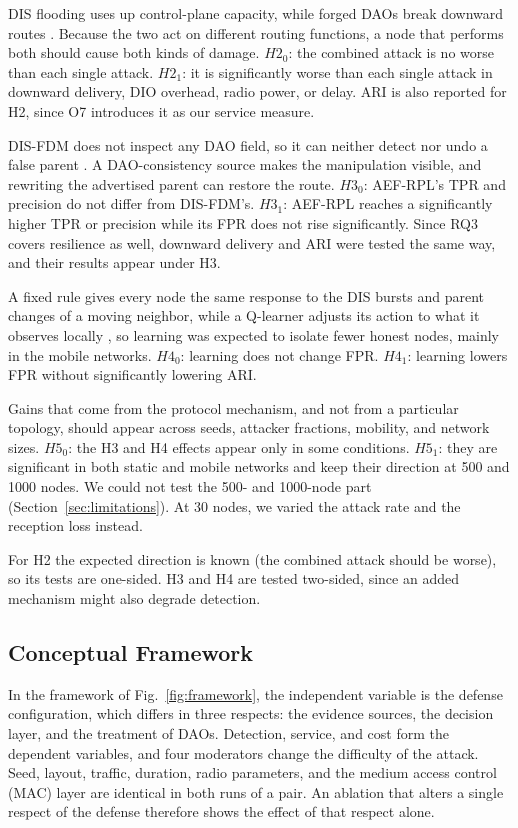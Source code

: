 DIS flooding uses up control-plane capacity, while forged DAOs break downward routes \cite{rajasekar2022,pu2018}. Because the two act on different routing functions, a node that performs both should cause both kinds of damage. $H2_0$: the combined attack is no worse than each single attack. $H2_1$: it is significantly worse than each single attack in downward delivery, DIO overhead, radio power, or delay. ARI is also reported for H2, since O7 introduces it as our service measure.

DIS-FDM does not inspect any DAO field, so it can neither detect nor undo a false parent \cite{prajisha2025}. A DAO-consistency source makes the manipulation visible, and rewriting the advertised parent can restore the route. $H3_0$: AEF-RPL's TPR and precision do not differ from DIS-FDM's. $H3_1$: AEF-RPL reaches a significantly higher TPR or precision while its FPR does not rise significantly. Since RQ3 covers resilience as well, downward delivery and ARI were tested the same way, and their results appear under H3.

A fixed rule gives every node the same response to the DIS bursts and parent changes of a moving neighbor, while a Q-learner adjusts its action to what it observes locally \cite{watkins1992,qsecrpl2023}, so learning was expected to isolate fewer honest nodes, mainly in the mobile networks. $H4_0$: learning does not change FPR. $H4_1$: learning lowers FPR without significantly lowering ARI.

Gains that come from the protocol mechanism, and not from a particular topology, should appear across seeds, attacker fractions, mobility, and network sizes. $H5_0$: the H3 and H4 effects appear only in some conditions. $H5_1$: they are significant in both static and mobile networks and keep their direction at 500 and 1000 nodes. We could not test the 500- and 1000-node part (Section~\ref{sec:limitations}). At 30 nodes, we varied the attack rate and the reception loss instead.

For H2 the expected direction is known (the combined attack should be worse), so its tests are one-sided. H3 and H4 are tested two-sided, since an added mechanism might also degrade detection.

\subsection{Conceptual Framework}
In the framework of Fig.~\ref{fig:framework}, the independent variable is the defense configuration, which differs in three respects: the evidence sources, the decision layer, and the treatment of DAOs. Detection, service, and cost form the dependent variables, and four moderators change the difficulty of the attack. Seed, layout, traffic, duration, radio parameters, and the medium access control (MAC) layer are identical in both runs of a pair. An ablation that alters a single respect of the defense therefore shows the effect of that respect alone.

